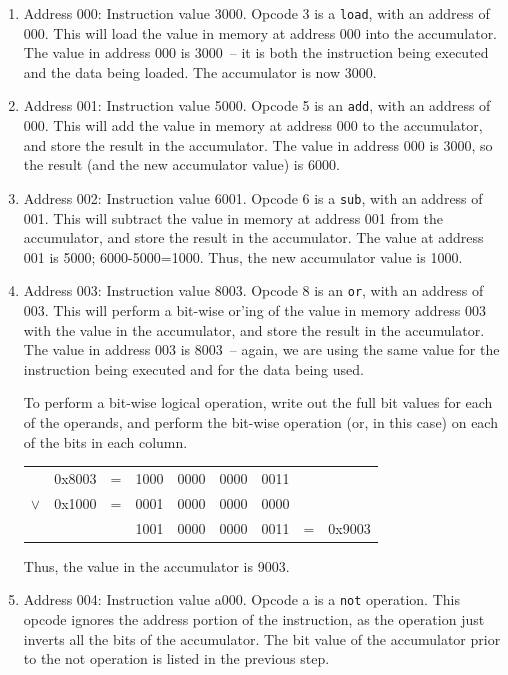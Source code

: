 \begin{enumerate}

\item Address 000: Instruction value 3000.  Opcode 3 is a {\tt load},
  with an address of 000.  This will load the value in memory at
  address 000 into the accumulator.  The value in address 000 is
  3000~-- it is both the instruction being executed and the data being
  loaded.  The accumulator is now 3000.

\item Address 001: Instruction value 5000.  Opcode 5 is an {\tt add},
  with an address of 000.  This will add the value in memory at
  address 000 to the accumulator, and store the result in the
  accumulator.  The value in address 000 is 3000, so the result (and
  the new accumulator value) is 6000.

\item Address 002: Instruction value 6001.  Opcode 6 is a {\tt sub},
  with an address of 001.  This will subtract the value in memory at
  address 001 from the accumulator, and store the result in the
  accumulator.  The value at address 001 is 5000; 6000-5000=1000.
  Thus, the new accumulator value is 1000.

\item Address 003: Instruction value 8003.  Opcode 8 is an {\tt or},
  with an address of 003.  This will perform a bit-wise or'ing of the
  value in memory address 003 with the value in the accumulator, and
  store the result in the accumulator.  The value in address 003 is
  8003~-- again, we are using the same value for the instruction being
  executed and for the data being used.

To perform a bit-wise logical operation, write out the full bit values
for each of the operands, and perform the bit-wise operation (or, in
this case) on each of the bits in each column.

\begin{tabular}{ccccccccc}
& 0x8003 & = & 1000 & 0000 & 0000 & 0011 \\
$\lor$ & 0x1000 & = & 0001 & 0000 & 0000 & 0000 \\ \cline{1-7}
& & & 1001 & 0000 & 0000 & 0011 & = & 0x9003 \\
\end{tabular}

Thus, the value in the accumulator is 9003.

\item Address 004: Instruction value a000.  Opcode a is a {\tt not}
  operation.  This opcode ignores the address portion of the
  instruction, as the operation just inverts all the bits of the
  accumulator.  The bit value of the accumulator prior to the not
  operation is listed in the previous step.


\end{enumerate}
